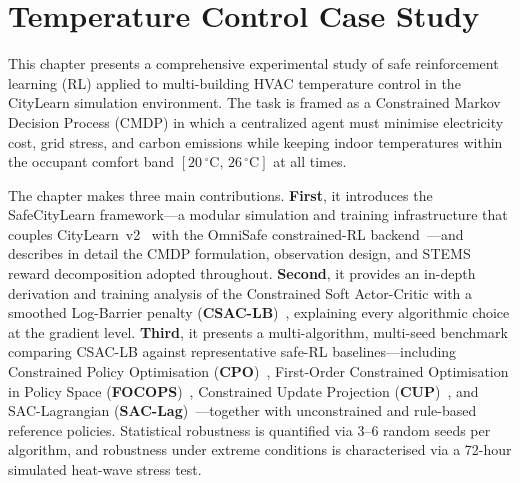 %

\chapter{Temperature Control Case Study}
\label{ch:temperature-case-study}

This chapter presents a comprehensive experimental study of safe reinforcement
learning (RL) applied to multi-building HVAC temperature control in the
CityLearn simulation environment.  The task is framed as a Constrained Markov
Decision Process (CMDP) in which a centralized agent must minimise electricity
cost, grid stress, and carbon emissions while keeping indoor temperatures within
the occupant comfort band $[20\,^\circ\text{C},\, 26\,^\circ\text{C}]$ at all
times.

The chapter makes three main contributions.  \textbf{First}, it introduces the
SafeCityLearn framework---a modular simulation and training infrastructure that
couples CityLearn~v2~\cite{nweye2023citylearn} with the OmniSafe
constrained-RL backend~\cite{omnisafe2023}---and describes in detail the
CMDP formulation, observation design, and STEMS reward decomposition adopted
throughout.  \textbf{Second}, it provides an in-depth derivation and training
analysis of the Constrained Soft Actor-Critic with a smoothed Log-Barrier
penalty (\textbf{CSAC-LB})~\cite{zhang2024csaclb}, explaining every
algorithmic choice at the gradient level.  \textbf{Third}, it presents a
multi-algorithm, multi-seed benchmark comparing CSAC-LB against representative
safe-RL baselines---including Constrained Policy Optimisation
(\textbf{CPO})~\cite{achiam2017cpo}, First-Order Constrained Optimisation in
Policy Space (\textbf{FOCOPS})~\cite{zhang2020focops}, Constrained Update
Projection (\textbf{CUP})~\cite{yang2022cup}, and SAC-Lagrangian
(\textbf{SAC-Lag})~\cite{ha2020learning}---together with unconstrained and
rule-based reference policies.  Statistical robustness is quantified via
\num{3}--\num{6} random seeds per algorithm, and robustness under extreme
conditions is characterised via a 72-hour simulated heat-wave stress test.


